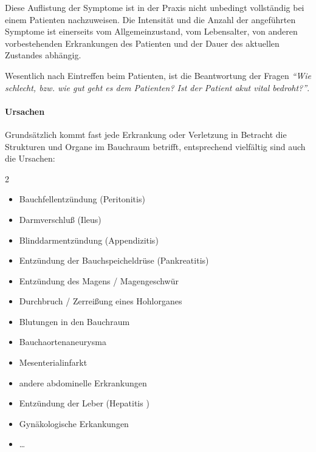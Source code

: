 Diese Auflistung der Symptome ist in der Praxis nicht
unbedingt vollständig bei einem Patienten nachzuweisen. Die
Intensität und die Anzahl der angeführten Symptome ist
einerseits vom Allgemeinzustand, vom Lebensalter, von
anderen vorbestehenden Erkrankungen des Patienten und der
Dauer des aktuellen Zustandes abhängig.

Wesentlich nach Eintreffen beim Patienten, ist die
Beantwortung der Fragen \emph{"`Wie schlecht, bzw. wie gut
geht es dem Patienten? Ist der Patient akut vital
bedroht?"'}.



\paragraph*{Ursachen}

Grundsätzlich kommt fast jede Erkrankung oder Verletzung in
Betracht die Strukturen und Organe im Bauchraum betrifft,
entsprechend vielfältig sind auch die Ursachen: 

\begin{multicols}{2}
\begin{itemize}
    \item Bauchfellentzündung (Peritonitis)
    \item Darmverschluß (Ileus)
    \item Blinddarmentzündung (Appendizitis)
    \item Entzündung der Bauchspeicheldrüse  (Pankreatitis)
    \item Entzündung des Magens / Magengeschwür
    \item Durchbruch / Zerreißung eines Hohlorganes
    \item Blutungen in den Bauchraum
    \item Bauchaortenaneurysma
    \item Mesenterialinfarkt
    \item andere abdominelle Erkrankungen
    \item Entzündung der Leber (Hepatitis )
    \item Gynäkologische Erkankungen
    \item \ldots
\end{itemize}
\end{multicols}


